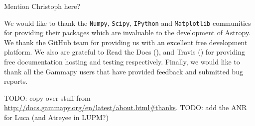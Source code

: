 \begin{acknowledgements}

Mention Christoph here?

We would like to thank the \texttt{Numpy}, \texttt{Scipy}, \texttt{IPython} and
\texttt{Matplotlib} communities for providing their packages which are invaluable
to the development of Astropy. We thank the GitHub team for providing us with
an excellent free development platform. We also are grateful to Read the Docs
(\ReadthedocsUrl), and Travis
(\TravisUrl) for providing free documentation
hosting and testing respectively. Finally, we would like to thank all the
Gammapy users that have provided feedback and submitted bug reports.    
    
TODO: copy over stuff from \url{http://docs.gammapy.org/en/latest/about.html#thanks}.
TODO: add the ANR for Luca (and Atreyee in LUPM?)

\end{acknowledgements}
